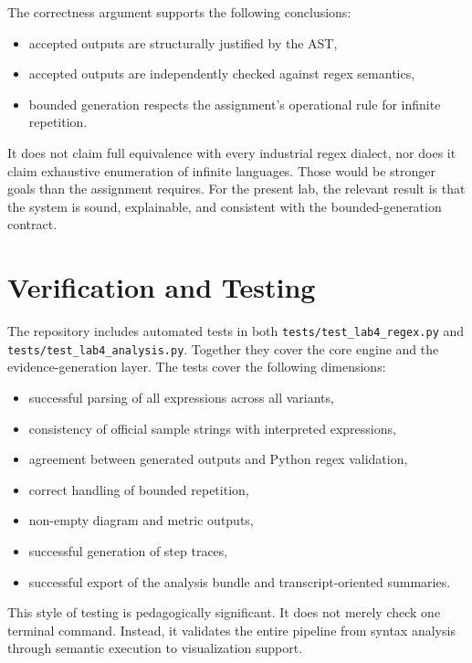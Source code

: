 \documentclass[a4paper,12pt]{article}
\begin{document}
The correctness argument supports the following conclusions:

\begin{itemize}
    \item accepted outputs are structurally justified by the AST,
    \item accepted outputs are independently checked against regex semantics,
    \item bounded generation respects the assignment's operational rule for infinite repetition.
\end{itemize}

It does not claim full equivalence with every industrial regex dialect, nor does it claim exhaustive enumeration of infinite languages. Those would be stronger goals than the assignment requires. For the present lab, the relevant result is that the system is sound, explainable, and consistent with the bounded-generation contract.

\section{Verification and Testing}

The repository includes automated tests in both \texttt{tests/test\_lab4\_regex.py} and \texttt{tests/test\_lab4\_analysis.py}. Together they cover the core engine and the evidence-generation layer. The tests cover the following dimensions:

\begin{itemize}
    \item successful parsing of all expressions across all variants,
    \item consistency of official sample strings with interpreted expressions,
    \item agreement between generated outputs and Python regex validation,
    \item correct handling of bounded repetition,
    \item non-empty diagram and metric outputs,
    \item successful generation of step traces,
    \item successful export of the analysis bundle and transcript-oriented summaries.
\end{itemize}

This style of testing is pedagogically significant. It does not merely check one terminal command. Instead, it validates the entire pipeline from syntax analysis through semantic execution to visualization support.
\end{document}
